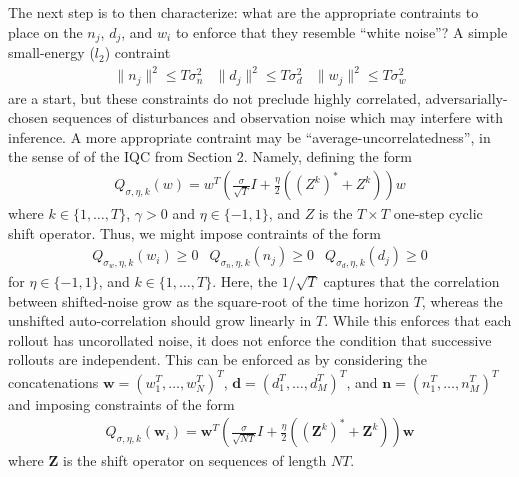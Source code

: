\documentclass[11pt]{article} %
\theoremstyle{plain}
\theoremstyle{definition}
\theoremstyle{remark}
\begin{document}
The next step is to then characterize: what are the appropriate contraints to place on the $n_j$, $d_j$, and $w_i$ to enforce that they resemble ``white noise''? A simple small-energy ($l_2$) contraint
\begin{eqnarray}
\|n_j\|^2 \le T\sigma^2_n & \|d_j\|^2 \le T\sigma_d^2 & \|w_j\|^2 \le T\sigma^2_w
\end{eqnarray}
are a start, but these constraints do not preclude highly correlated, adversarially-chosen sequences of disturbances and observation noise which may interfere with inference. A more appropriate contraint may be ``average-uncorrelatedness'', in the sense of of the IQC from Section 2. Namely, defining the form 
\begin{eqnarray}\label{Qform}
Q_{\sigma,\eta,k}(w) =  w^T(\frac{\sigma}{\sqrt{T}} I + \frac{\eta}{2}((Z^k)^* + Z^k))w  
\end{eqnarray}
where $k \in \{1,\dots,T\}$, $\gamma > 0$ and $\eta \in \{-1,1\}$, and $Z$ is the $T\times T$ one-step cyclic shift operator.  Thus, we might impose contraints of the form
\begin{eqnarray}
Q_{\sigma_w,\eta,k}(w_i) \ge 0 &  Q_{\sigma_n,\eta,k}(n_j) \ge 0 &  Q_{\sigma_d,\eta,k}(d_j) \ge 0   
\end{eqnarray}
for $\eta \in \{-1,1\}$, and $k \in \{1,\dots,T\}$. Here, the $1/\sqrt{T}$ captures that the correlation between shifted-noise grow as the square-root of the time horizon $T$, whereas the unshifted auto-correlation should grow linearly in $T$. While this enforces that each rollout has uncorollated noise, it does not enforce the condition that successive rollouts are independent. This can be enforced as by considering the concatenations $\mathbf{w} = (w_1^T,\dots,w_N^T)^T$, $\mathbf{d} = (d_1^T,\dots,d_M^T)^T$, and $\mathbf{n} = (n_1^T,\dots,n_M^T)^T$ and imposing constraints of the form
\begin{eqnarray}\label{Qform}
Q_{\sigma,\eta,k}(\mathbf{w}_i) =  \mathbf{w}^T(\frac{\sigma}{\sqrt{NT}} I + \frac{\eta}{2}((\mathbf{Z}^k)^* + \mathbf{Z}^k))\mathbf{w} 
\end{eqnarray}
where $\mathbf{Z}$ is the shift operator on sequences of length $NT$.
\end{document}
